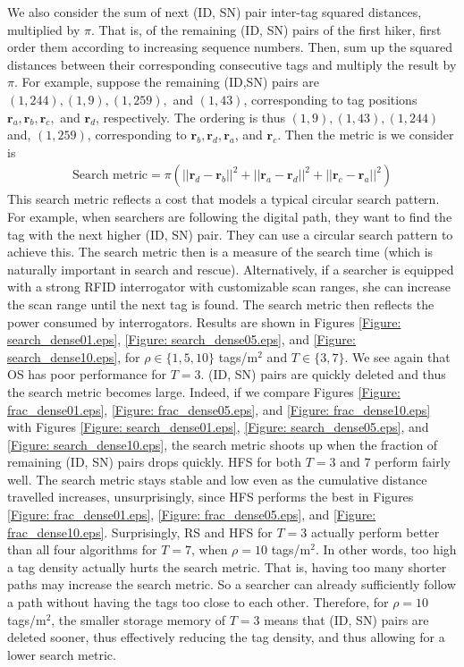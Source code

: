 We also consider the sum of next (ID, SN) pair inter-tag squared distances, multiplied by $\pi$.  That is, of the remaining (ID, SN) pairs of the first hiker, first order them according to increasing sequence numbers.  Then, sum up the squared distances between their corresponding consecutive tags and multiply the result by $\pi$.  For example, suppose the remaining (ID,SN) pairs are $(1, 244), (1, 9), (1, 259),$ and $(1, 43)$, corresponding to tag positions $\mathbf{r}_a, \mathbf{r}_b, \mathbf{r}_c,$ and $\mathbf{r}_d$, respectively. The ordering is thus $(1, 9), (1, 43), (1, 244)$ and, $(1, 259)$, corresponding to $\mathbf{r}_b, \mathbf{r}_d, \mathbf{r}_a$, and $\mathbf{r}_c$. Then the metric is we consider is 
\begin{eqnarray}
\mbox{Search metric} = \pi \left( || \mathbf{r}_d - \mathbf{r}_b ||^2 + || \mathbf{r}_a - \mathbf{r}_d ||^2 + || \mathbf{r}_c - \mathbf{r}_a ||^2 \right)
\end{eqnarray}
This search metric reflects a cost that models a typical circular search pattern.  For example, when searchers are following the digital path, they want to find the tag with the next higher (ID, SN) pair.  They can use a circular search pattern to achieve this.  The search metric then is a measure of the search time (which is naturally important in search and rescue).  Alternatively, if a searcher is equipped with a strong RFID interrogator with customizable scan ranges, she can increase the scan range until the next tag is found.  The search metric then reflects the power consumed by interrogators.  Results are shown in Figures \ref{Figure: search_dense01.eps}, \ref{Figure: search_dense05.eps}, and \ref{Figure: search_dense10.eps}, for $\rho \in \{1, 5, 10\}$ tags/m$^2$ and $T \in \{3, 7\}$.  We see again that OS has poor performance for $T=3$.  (ID, SN) pairs are quickly deleted and thus the search metric becomes large.  Indeed, if we compare Figures \ref{Figure: frac_dense01.eps}, \ref{Figure: frac_dense05.eps}, and \ref{Figure: frac_dense10.eps} with Figures \ref{Figure: search_dense01.eps}, \ref{Figure: search_dense05.eps}, and \ref{Figure: search_dense10.eps}, the search metric shoots up when the fraction of remaining (ID, SN) pairs drops quickly.  HFS for both $T=3$ and $7$ perform fairly well.  The search metric stays stable and low even as the cumulative distance travelled increases, unsurprisingly, since HFS performs the best in Figures \ref{Figure: frac_dense01.eps}, \ref{Figure: frac_dense05.eps}, and \ref{Figure: frac_dense10.eps}.  Surprisingly, RS and HFS for $T=3$ actually perform better than all four algorithms for $T=7$, when $\rho = 10$ tags/m$^2$.  In other words, too high a tag density actually hurts the search metric. That is, having too many shorter paths may increase the search metric. So a searcher can already sufficiently follow a path without having the tags too close to each other.  Therefore, for $\rho = 10$ tags/m$^2$, the smaller storage memory of $T=3$ means that (ID, SN) pairs are deleted sooner, thus effectively reducing the tag density, and thus allowing for a lower search metric.

